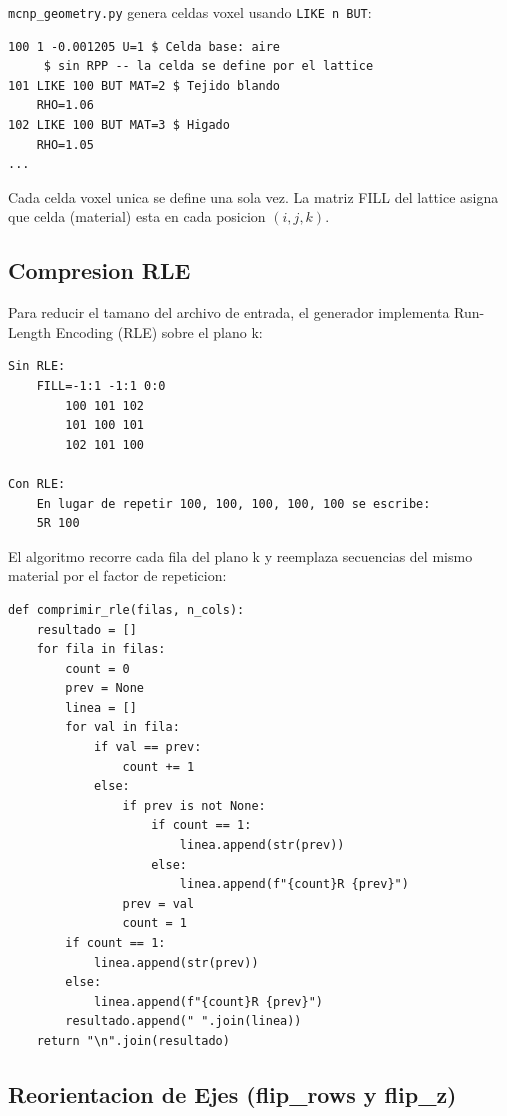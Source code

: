 \documentclass[12pt,a4paper]{article}
\begin{document}
\texttt{mcnp\_geometry.py} genera celdas voxel usando \texttt{LIKE n BUT}:

\begin{verbatim}
100 1 -0.001205 U=1 $ Celda base: aire
     $ sin RPP -- la celda se define por el lattice
101 LIKE 100 BUT MAT=2 $ Tejido blando
    RHO=1.06
102 LIKE 100 BUT MAT=3 $ Higado
    RHO=1.05
...
\end{verbatim}

Cada celda voxel unica se define una sola vez. La matriz FILL del lattice asigna que celda (material) esta en cada posicion $(i,j,k)$.

\subsection{Compresion RLE}

Para reducir el tamano del archivo de entrada, el generador implementa Run-Length Encoding (RLE) sobre el plano k:

\begin{verbatim}
Sin RLE:
    FILL=-1:1 -1:1 0:0
        100 101 102
        101 100 101
        102 101 100

Con RLE:
    En lugar de repetir 100, 100, 100, 100, 100 se escribe:
    5R 100
\end{verbatim}

El algoritmo recorre cada fila del plano k y reemplaza secuencias del mismo material por el factor de repeticion:

\begin{verbatim}
def comprimir_rle(filas, n_cols):
    resultado = []
    for fila in filas:
        count = 0
        prev = None
        linea = []
        for val in fila:
            if val == prev:
                count += 1
            else:
                if prev is not None:
                    if count == 1:
                        linea.append(str(prev))
                    else:
                        linea.append(f"{count}R {prev}")
                prev = val
                count = 1
        if count == 1:
            linea.append(str(prev))
        else:
            linea.append(f"{count}R {prev}")
        resultado.append(" ".join(linea))
    return "\n".join(resultado)
\end{verbatim}

\subsection{Reorientacion de Ejes (flip\_rows y flip\_z)}
\end{document}
